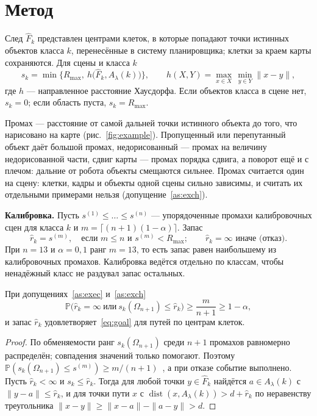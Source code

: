 \section{Метод}\label{sec:method}

\begin{definition}
След $\hat F_k$ представлен центрами клеток, в которые попадают точки истинных объектов класса $k$, перенесённые в систему планировщика; клетки за краем карты сохраняются. Для сцены и класса $k$
\begin{equation}
  s_k = \min\bigl\{ R_{\max},\ h\bigl(\hat F_k, A_\lambda(k)\bigr) \bigr\},
  \qquad h(X, Y) = \max_{x \in X}\, \min_{y \in Y} \|x - y\|,
  \label{eq:miss}
\end{equation}
где $h$ --- направленное расстояние Хаусдорфа. Если объектов класса в сцене нет, $s_k = 0$; если область пуста, $s_k = R_{\max}$.
\end{definition}

Промах --- расстояние от самой дальней точки истинного объекта до того, что нарисовано на карте (рис.~\ref{fig:example}). Пропущенный или перепутанный объект даёт большой промах, недорисованный --- промах на величину недорисованной части, сдвиг карты --- промах порядка сдвига, а поворот ещё и с плечом: дальние от робота объекты смещаются сильнее. Промах считается один на сцену: клетки, кадры и объекты одной сцены сильно зависимы, и считать их отдельными примерами нельзя (допущение~\ref{as:exch}).

\textbf{Калибровка.} Пусть $s^{(1)} \le \dots \le s^{(n)}$ --- упорядоченные промахи калибровочных сцен для класса $k$ и $m = \lceil (n + 1)(1 - \alpha) \rceil$. Запас
\begin{equation}
  \hat r_k = s^{(m)}, \quad \text{если } m \le n \text{ и } s^{(m)} < R_{\max}; \qquad \hat r_k = \infty \text{ иначе (отказ)}.
\end{equation}
При $n = 13$ и $\alpha = 0{,}1$ ранг $m = 13$, то есть запас равен наибольшему из калибровочных промахов. Калибровка ведётся отдельно по классам, чтобы ненадёжный класс не раздувал запас остальных.

\begin{proposition}\label{prop:valid}
При допущениях~\ref{as:exec} и~\ref{as:exch}
\[
  \mathbb P\bigl(\hat r_k = \infty \ \text{или}\ s_k(\Omega_{n+1}) \le \hat r_k\bigr) \ge \frac{m}{n + 1} \ge 1 - \alpha,
\]
и запас $\hat r_k$ удовлетворяет~\eqref{eq:goal} для путей по центрам клеток.
\end{proposition}
\begin{proof}
По обменяемости ранг $s_k(\Omega_{n+1})$ среди $n + 1$ промахов равномерно распределён; совпадения значений только помогают. Поэтому $\mathbb P(s_k(\Omega_{n+1}) \le s^{(m)}) \ge m / (n + 1)$~\cite{gentle}, а при отказе событие выполнено. Пусть $\hat r_k < \infty$ и $s_k \le \hat r_k$. Тогда для любой точки $y \in \hat F_k$ найдётся $a \in A_\lambda(k)$ с $\|y - a\| \le \hat r_k$, и для точки пути $x$ с $\operatorname{dist}(x, A_\lambda(k)) > d + \hat r_k$ по неравенству треугольника $\|x - y\| \ge \|x - a\| - \|a - y\| > d$.
\end{proof}

